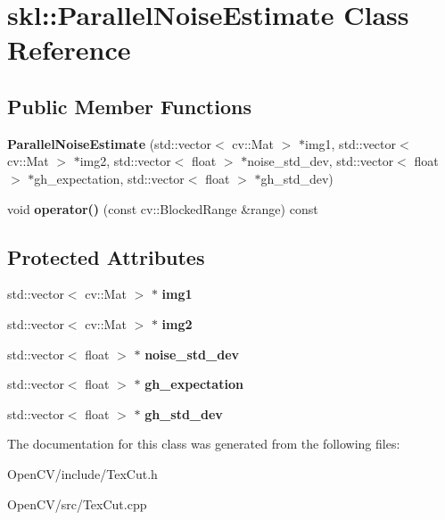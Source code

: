 \hypertarget{classskl_1_1_parallel_noise_estimate}{}\section{skl\+:\+:Parallel\+Noise\+Estimate Class Reference}
\label{classskl_1_1_parallel_noise_estimate}
\subsection*{Public Member Functions}
\begin{DoxyCompactItemize}
\item 
\hypertarget{classskl_1_1_parallel_noise_estimate_a1fe9fca4c7806c2c4c5d2416fe89be7a}{}\label{classskl_1_1_parallel_noise_estimate_a1fe9fca4c7806c2c4c5d2416fe89be7a} 
{\bfseries Parallel\+Noise\+Estimate} (std\+::vector$<$ cv\+::\+Mat $>$ $\ast$img1, std\+::vector$<$ cv\+::\+Mat $>$ $\ast$img2, std\+::vector$<$ float $>$ $\ast$noise\+\_\+std\+\_\+dev, std\+::vector$<$ float $>$ $\ast$gh\+\_\+expectation, std\+::vector$<$ float $>$ $\ast$gh\+\_\+std\+\_\+dev)
\item 
\hypertarget{classskl_1_1_parallel_noise_estimate_a4f8992998a781a9a9d609b778d3ab9a7}{}\label{classskl_1_1_parallel_noise_estimate_a4f8992998a781a9a9d609b778d3ab9a7} 
void {\bfseries operator()} (const cv\+::\+Blocked\+Range \&range) const
\end{DoxyCompactItemize}
\subsection*{Protected Attributes}
\begin{DoxyCompactItemize}
\item 
\hypertarget{classskl_1_1_parallel_noise_estimate_a53659761d23cf620f6853ce58933a9b6}{}\label{classskl_1_1_parallel_noise_estimate_a53659761d23cf620f6853ce58933a9b6} 
std\+::vector$<$ cv\+::\+Mat $>$ $\ast$ {\bfseries img1}
\item 
\hypertarget{classskl_1_1_parallel_noise_estimate_ab88a924f42cc8492cd5ebe4d319f5950}{}\label{classskl_1_1_parallel_noise_estimate_ab88a924f42cc8492cd5ebe4d319f5950} 
std\+::vector$<$ cv\+::\+Mat $>$ $\ast$ {\bfseries img2}
\item 
\hypertarget{classskl_1_1_parallel_noise_estimate_a47b5e190334a747857fd886a14907b9a}{}\label{classskl_1_1_parallel_noise_estimate_a47b5e190334a747857fd886a14907b9a} 
std\+::vector$<$ float $>$ $\ast$ {\bfseries noise\+\_\+std\+\_\+dev}
\item 
\hypertarget{classskl_1_1_parallel_noise_estimate_aa516fae0d3d4e5584c25013d4315356f}{}\label{classskl_1_1_parallel_noise_estimate_aa516fae0d3d4e5584c25013d4315356f} 
std\+::vector$<$ float $>$ $\ast$ {\bfseries gh\+\_\+expectation}
\item 
\hypertarget{classskl_1_1_parallel_noise_estimate_acac1dabd9e37e9541931ea9adaf8e0c3}{}\label{classskl_1_1_parallel_noise_estimate_acac1dabd9e37e9541931ea9adaf8e0c3} 
std\+::vector$<$ float $>$ $\ast$ {\bfseries gh\+\_\+std\+\_\+dev}
\end{DoxyCompactItemize}


The documentation for this class was generated from the following files\+:\begin{DoxyCompactItemize}
\item 
Open\+C\+V/include/Tex\+Cut.\+h\item 
Open\+C\+V/src/Tex\+Cut.\+cpp\end{DoxyCompactItemize}
